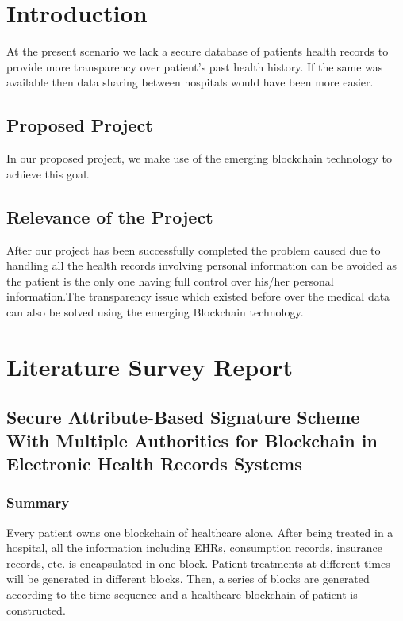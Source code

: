 \documentclass[11pt]{report}
\begin{document}
\newpage
\tableofcontents
\newpage
{}

\listoffigures
\newpage


\chapter {Introduction}  


At the present scenario we lack a secure database of patients health records to provide more transparency over patient’s past health history. If the same was available then data sharing between hospitals would have been more easier.


\section{Proposed Project}

In our proposed project, we make use of the emerging blockchain technology to achieve this goal. 

\section{Relevance of the Project}

After our project has been successfully completed the problem caused due to handling all the health records involving personal information can be avoided as the patient is the only one having full control over his/her personal information.The transparency issue which existed before over the medical data can also be solved using the emerging Blockchain technology.



\chapter{Literature Survey Report}  

\section{Secure Attribute-Based Signature Scheme With Multiple Authorities for Blockchain in Electronic Health Records Systems \cite{1}}
 
\subsection{Summary}
Every patient owns one blockchain of healthcare alone. After being treated in a hospital, all the information including EHRs, consumption records, insurance records, etc. is encapsulated in one block. Patient treatments at different times will be generated in different blocks. Then, a series of blocks are generated according to the time sequence and a healthcare blockchain of patient is constructed.
\end{document}
